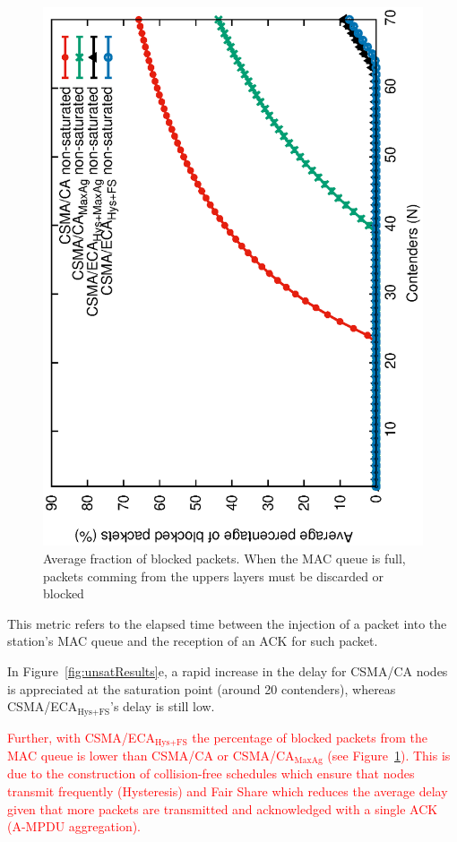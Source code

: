 	\begin{figure}[tb]
		\centering
		\includegraphics[width=0.7\linewidth,angle=-90]{figures/unsaturated/blockingProb-unsat/blocking-unsaturated-TON.eps}
		\caption{Average fraction of blocked packets. When the MAC queue is full, packets comming from the uppers layers must be discarded or blocked}
		\label{fig:blocked-packets}
	\end{figure}	
	
	This metric refers to the elapsed time between the injection of a packet into the station's MAC queue and the reception of an ACK for such packet. 
	
	In Figure~\ref{fig:unsatResults}e, a rapid increase in the delay for CSMA/CA nodes is appreciated at the saturation point (around 20 contenders), whereas CSMA/ECA$_{\text{Hys+FS}}$'s delay is still low. 
	
	\textcolor{red}{Further, with CSMA/ECA$_{\text{Hys+FS}}$ the percentage of blocked packets from the MAC queue is lower than CSMA/CA or CSMA/CA$_{\text{MaxAg}}$ (see Figure~\ref{fig:blocked-packets}). This is due to the construction of collision-free schedules which ensure that nodes transmit frequently (Hysteresis) and Fair Share which reduces the average delay given that more packets are transmitted and acknowledged with a single ACK (A-MPDU aggregation).}
	
